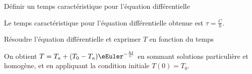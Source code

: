 \begin{enonce}
Définir un temps caractéristique pour l'équation différentielle
 \end{enonce}


\begin{corrige}
Le temps caractéristique pour l'équation différentielle obtenue est $\tau=\frac{C}{h}$.
\end{corrige}



\begin{enonce}
Résoudre l'équation différentielle et exprimer $T$ en fonction du temps
\end{enonce}


\begin{corrige}
On obtient $T=T_a+ (T_0-T_a)\eEuler^{-\frac{ht}{C}}$ en sommant solutions particulière et homogène, et en appliquant la condition initiale $T(0)=T_0$.
\end{corrige}





\finEntrainement


\hauteurLargeurCadreReponse		{8mm}{3cm}
\initialisationEntrainement


\debutEntrainement


